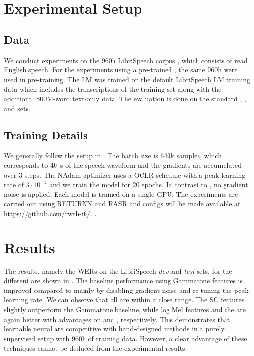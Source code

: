 \documentclass{INTERSPEECH2023}
\begin{document}
\section{Experimental Setup}
\subsection{Data}
We conduct experiments on the 960h LibriSpeech corpus \cite{panayotov2015librispeech}, which consists of read English speech.
For the experiments using a pre-trained \wvtwo \fe, the same 960h were used in pre-training.
The \gls{LM} was trained on the default LibriSpeech \gls{LM} training data which includes the transcriptions of the training set along with the additional 800M-word text-only data.
The evaluation is done on the standard \devclean, \devother, \testclean and \testother sets.

\subsection{Training Details}
We generally follow the setup in \cite{zhou2022efficient}.
The batch size is 640k samples, which corresponds to \SI{40}{\second} of the speech waveform and the gradients are accumulated over 3 steps.
The NAdam optimizer uses a \gls{OCLR} schedule with a peak learning rate of $3\cdot 10^{-4}$ and we train the model for 20 epochs.
In contrast to \cite{zhou2022efficient}, no gradient noise is applied.
Each model is trained on a single \gls{GPU}.
The experiments are carried out using 
\ifinterspeechfinal
     RETURNN and RASR
\fi
and configs will be made available at
\ifinterspeechfinal
     https://github.com/rwth-i6/.
.
\fi

\section{Results}
The results, namely the \glspl{WER} on the LibriSpeech \textit{dev} and \textit{test} sets, for the different \fes are shown in .
The baseline performance using Gammatone features is improved compared to \cite{zhou2022efficient} mainly by disabling gradient noise and re-tuning the peak learning rate.
We can observe that all \fes are within a close range.
The \gls{SC} features slightly outperform the Gammatone baseline, while log Mel features and the \wvtwo \fe are again better with advantages on \devother and \testother, respectively.
This demonstrates that learnable neural \fes are competitive with hand-designed methods in a purely supervised setup with 960h of training data.
However, a clear advantage of these techniques cannot be deduced from the experimental results.
\end{document}
